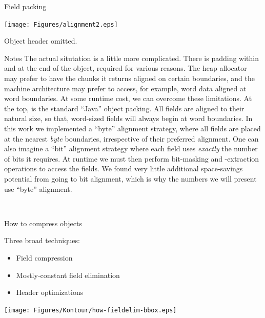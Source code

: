 \documentclass[%
pdf,
colorBG,
slideColor,
nototal,
oqe
]{prosper}
\renewcommand{\yellow}{\colC}
\newenvironment{talknotes}{\begin{slide}{Notes}\tiny}{\end{slide}}
\begin{document}

\begin{slide}{Field packing}
\begin{center}
\vspace{0.75cm}
\texttt{[image: Figures/alignment2.eps]}

\small Object header omitted.
\end{center}
\end{slide}

\begin{talknotes}
The actual situtation is a little more complicated.  There is padding
within and at the end of the object, required for various reasons.
The heap allocator may prefer to have the chunks it returns aligned
on certain boundaries, and the machine architecture may prefer to
access, for example, word data aligned at word boundaries.  At
some runtime cost, we can overcome these limitations.  At the top, is
the standard ``Java'' object packing.  All fields are aligned to their
natural size, so that, word-sized fields will always begin at word
boundaries.  In this work we implemented a ``byte'' alignment
strategy, where all fields are placed at the nearest \emph{byte}
boundaries, irrespective of their preferred alignment.  One can also
imagine a ``bit'' alignment strategy where each field uses
\emph{exactly} the number of bits it requires.  At runtime we must
then perform bit-masking and -extraction operations to access the
fields.  We found very little additional space-savings potential from
going to bit alignment, which is why the numbers we will present use
``byte'' alignment.

~%
\end{talknotes}

\begin{slide}{How to compress objects} %

Three broad techniques:

\parbox[b]{2.5in}{%
\begin{itemize}%
\lightgray\renewcommand{\green}{\lightgray}%
\item Field compression
\fieldelim\renewcommand{\green}{\fieldelim}%
\item Mostly-constant field elimination
\lightgray\renewcommand{\green}{\lightgray}%
\item Header optimizations
\renewcommand{\green}{\yellow} %
\end{itemize}
}%
\parbox[b]{1.75in}{%
\hspace*{0.106in}\texttt{[image: Figures/Kontour/how-fieldelim-bbox.eps]}%
}%
\end{slide}
\end{document}
